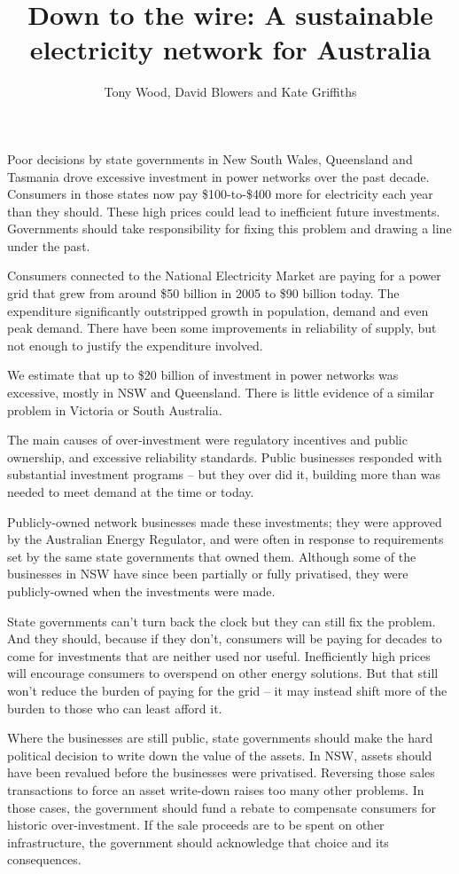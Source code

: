 \documentclass[FrontPage]{grattan}
\author{Tony Wood, David Blowers and Kate Griffiths}
\title{Down to the wire: A sustainable electricity network for Australia}
\begin{document}
\begin{overview}
Poor decisions by state governments in New South Wales, Queensland and Tasmania drove excessive investment in power networks over the past decade. Consumers in those states now pay \$100-to-\$400 more for electricity each year than they should. These high prices could lead to inefficient future investments. Governments should take responsibility for fixing this problem and drawing a line under the past.

Consumers connected to the National Electricity Market are paying for a power grid that grew from around \$50 billion in 2005 to \$90 billion today. The expenditure significantly outstripped growth in population, demand and even peak demand. There have been some improvements in reliability of supply, but not enough to justify the expenditure involved.

We estimate that up to \$20 billion of investment in power networks was excessive, mostly in NSW and Queensland. There is little evidence of a similar problem in Victoria or South Australia. 

The main causes of over-investment were regulatory incentives and public ownership, and excessive reliability standards. Public businesses responded with substantial investment programs -- but they over did it, building more than was needed to meet demand at the time or today.

Publicly-owned network businesses made these investments; they were approved by the Australian Energy Regulator, and were often in response to requirements set by the same state governments that owned them. Although some of the businesses in NSW have since been partially or fully privatised, they were publicly-owned when the investments were made.

State governments can't turn back the clock but they can still fix the problem. And they should, because if they don't, consumers will be paying for decades to come for investments that are neither used nor useful. Inefficiently high prices will encourage consumers to overspend on other energy solutions. But that still won't reduce the burden of paying for the grid -- it may instead shift more of the burden to those who can least afford it.

Where the businesses are still public, state governments should make the hard political decision to write down the value of the assets. In NSW, assets should have been revalued before the businesses were privatised. Reversing those sales transactions to force an asset write-down raises too many other problems. In those cases, the government should fund a rebate to compensate consumers for historic over-investment. If the sale proceeds are to be spent on other infrastructure, the government should acknowledge that choice and its consequences.


\end{overview}
\end{document}
